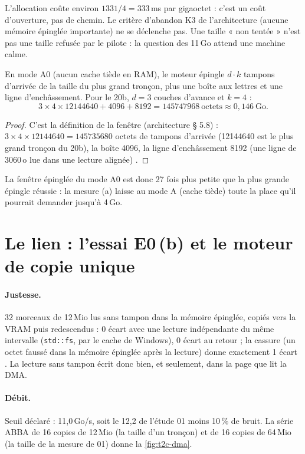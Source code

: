 L'allocation coûte environ $\num{1331}/4 = 333$\,ms par gigaoctet \calc : c'est un coût d'ouverture, pas de chemin. Le critère d'abandon K3 de l'architecture (aucune mémoire épinglée importante) ne se déclenche pas. Une taille « non tentée » n'est pas une taille refusée par le pilote : la question des 11\,Go attend une machine calme.

\begin{proposition}\label{prop:t2c-fenetre-a0}
En mode A0 (aucun cache tiède en RAM), le moteur épingle $d \cdot k$ tampons d'arrivée de la taille du plus grand tronçon, plus une boîte aux lettres et une ligne d'enchâssement. Pour le 20b, $d = 3$ couches d'avance et $k = 4$ :
\[
3 \times 4 \times \num{12144640} + \num{4096} + \num{8192} = \num{145747968}\ \text{octets} \approx 0{,}146\ \text{Go}.
\]
\end{proposition}

\begin{proof}
C'est la définition de la fenêtre (architecture § 5.8) : $3 \times 4 \times \num{12144640} = \num{145735680}$ octets de tampons d'arrivée (\num{12144640} est le plus grand tronçon du 20b), la boîte \num{4096}, la ligne d'enchâssement \num{8192} (une ligne de \num{3060}\,o lue dans une lecture alignée) \calc.
\end{proof}

La fenêtre épinglée du mode A0 est donc 27 fois plus petite que la plus grande épingle réussie \calc : la mesure (a) laisse au mode A (cache tiède) toute la place qu'il pourrait demander jusqu'à 4\,Go.

\section{Le lien : l'essai E0\,(b) et le moteur de copie unique}\label{sec:t2c-dma}

\paragraph{Justesse.} 32 morceaux de 12\,Mio lus sans tampon dans la mémoire épinglée, copiés vers la VRAM puis redescendus : 0 écart avec une lecture indépendante du même intervalle (\texttt{std::fs}, par le cache de Windows), 0 écart au retour ; la cassure (un octet faussé dans la mémoire épinglée après la lecture) donne exactement 1 écart \mes. La lecture sans tampon écrit donc bien, et seulement, dans la page que lit la DMA.

\paragraph{Débit.} Seuil déclaré : 11,0\,Go/s, soit le 12,2 de l'étude 01 moins 10\,\% de bruit. La série ABBA de 16 copies de 12\,Mio (la taille d'un tronçon) et de 16 copies de 64\,Mio (la taille de la mesure de 01) donne la \cref{fig:t2c-dma}.

